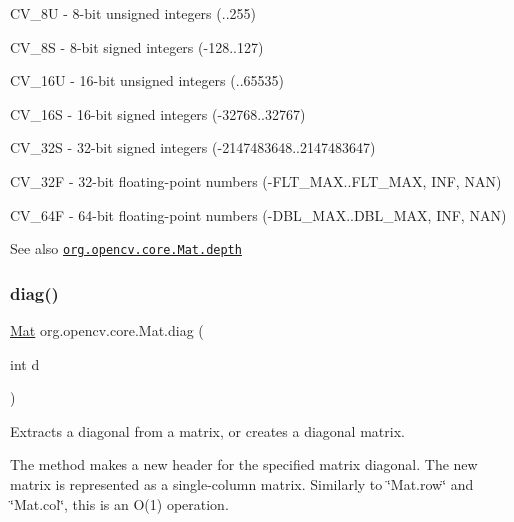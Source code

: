 \begin{DoxyItemize}
\item {\ttfamily C\+V\+\_\+8U} -\/ 8-\/bit unsigned integers ({..255}) 
\item {\ttfamily C\+V\+\_\+8S} -\/ 8-\/bit signed integers ({\ttfamily -\/128..127}) 
\item {\ttfamily C\+V\+\_\+16U} -\/ 16-\/bit unsigned integers ({..65535}) 
\item {\ttfamily C\+V\+\_\+16S} -\/ 16-\/bit signed integers ({\ttfamily -\/32768..32767}) 
\item {\ttfamily C\+V\+\_\+32S} -\/ 32-\/bit signed integers ({\ttfamily -\/2147483648..2147483647}) 
\item {\ttfamily C\+V\+\_\+32F} -\/ 32-\/bit floating-\/point numbers ({\ttfamily -\/\+F\+L\+T\+\_\+\+M\+AX..F\+L\+T\+\_\+\+M\+AX, I\+NF, N\+AN}) 
\item {\ttfamily C\+V\+\_\+64F} -\/ 64-\/bit floating-\/point numbers ({\ttfamily -\/\+D\+B\+L\+\_\+\+M\+AX..D\+B\+L\+\_\+\+M\+AX, I\+NF, N\+AN}) 
\end{DoxyItemize}

\begin{DoxySeeAlso}{See also}
\href{http://docs.opencv.org/modules/core/doc/basic_structures.html#mat-depth}{\tt org.\+opencv.\+core.\+Mat.\+depth} 
\end{DoxySeeAlso}
\mbox{\label{classorg_1_1opencv_1_1core_1_1_mat_aa28ea6e2ec65861e30319e443dbde298}} 
\subsubsection{\texorpdfstring{diag()}{diag()}\hspace{0.1cm}{\footnotesize\ttfamily [1/3]}}
{\footnotesize\ttfamily \mbox{\hyperlink{classorg_1_1opencv_1_1core_1_1_mat}{Mat}} org.\+opencv.\+core.\+Mat.\+diag (\begin{DoxyParamCaption}\item[{int}]{d }\end{DoxyParamCaption})}

Extracts a diagonal from a matrix, or creates a diagonal matrix.

The method makes a new header for the specified matrix diagonal. The new matrix is represented as a single-\/column matrix. Similarly to \char`\"{}\+Mat.\+row\char`\"{} and \char`\"{}\+Mat.\+col\char`\"{}, this is an O(1) operation.


